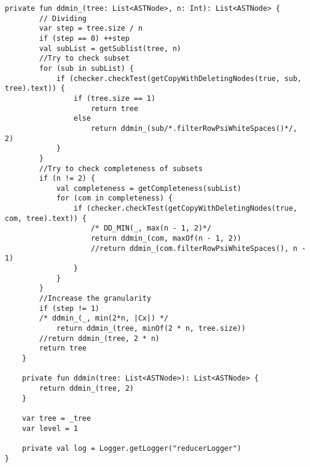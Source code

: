 \begin{lstlisting}[caption = Исходный код файла HierarchialDeltaDebugger.kt]
    private fun ddmin_(tree: List<ASTNode>, n: Int): List<ASTNode> {
        // Dividing
        var step = tree.size / n
        if (step == 0) ++step
        val subList = getSublist(tree, n)
        //Try to check subset
        for (sub in subList) {
            if (checker.checkTest(getCopyWithDeletingNodes(true, sub, tree).text)) {
                if (tree.size == 1)
                    return tree
                else
                    return ddmin_(sub/*.filterRowPsiWhiteSpaces()*/, 2)
            }
        }
        //Try to check completeness of subsets
        if (n != 2) {
            val completeness = getCompleteness(subList)
            for (com in completeness) {
                if (checker.checkTest(getCopyWithDeletingNodes(true, com, tree).text)) {
                    /* DD_MIN(_, max(n - 1, 2)*/
                    return ddmin_(com, maxOf(n - 1, 2))
                    //return ddmin_(com.filterRowPsiWhiteSpaces(), n - 1)
                }
            }
        }
        //Increase the granularity
        if (step != 1)
        /* ddmin_(_, min(2*n, |Cx|) */
            return ddmin_(tree, minOf(2 * n, tree.size))
        //return ddmin_(tree, 2 * n)
        return tree
    }

    private fun ddmin(tree: List<ASTNode>): List<ASTNode> {
        return ddmin_(tree, 2)
    }

    var tree = _tree
    var level = 1

    private val log = Logger.getLogger("reducerLogger")
}
\end{lstlisting}

